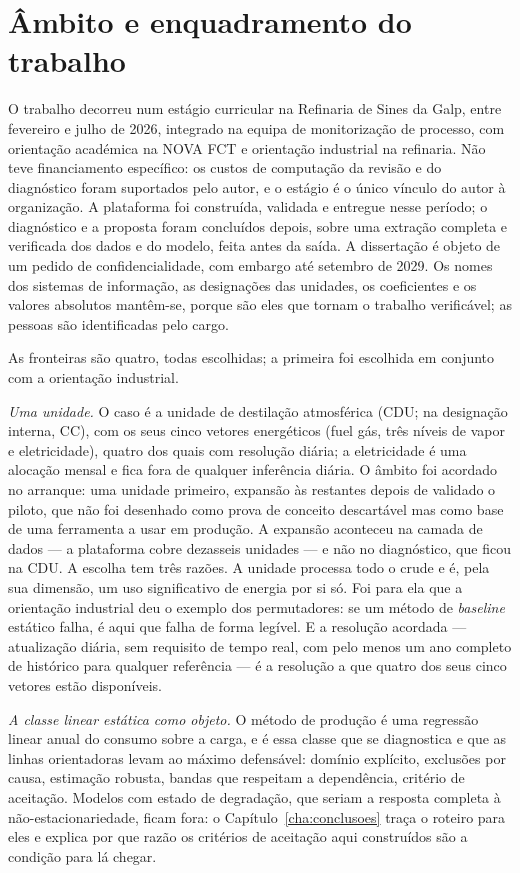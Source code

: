 \section{Âmbito e enquadramento do trabalho}
\label{sec:ambito}

O trabalho decorreu num estágio curricular na Refinaria de Sines da
Galp, entre fevereiro e julho de 2026, integrado na equipa de
monitorização de processo, com orientação académica na NOVA FCT e
orientação industrial na refinaria. Não teve financiamento específico:
os custos de computação da revisão e do diagnóstico foram suportados
pelo autor, e o estágio é o único vínculo do autor à organização. A
plataforma foi construída, validada e entregue nesse período; o
diagnóstico e a proposta foram concluídos depois, sobre uma extração
completa e verificada dos dados e do modelo, feita antes da saída. A
dissertação é objeto de um pedido de confidencialidade, com embargo até
setembro de 2029. Os nomes dos sistemas de informação, as designações
das unidades, os coeficientes e os valores absolutos mantêm-se, porque
são eles que tornam o trabalho verificável; as pessoas são identificadas
pelo cargo.

As fronteiras são quatro, todas escolhidas; a primeira foi escolhida em
conjunto com a orientação industrial.

\emph{Uma unidade.} O caso é a unidade de destilação atmosférica (CDU;
na designação interna, CC), com os seus cinco vetores energéticos (fuel
gás, três níveis de vapor e eletricidade), quatro dos quais com
resolução diária; a eletricidade é uma alocação mensal e fica fora de
qualquer inferência diária. O âmbito foi acordado no arranque: uma
unidade primeiro, expansão às restantes depois de validado o piloto, que
não foi desenhado como prova de conceito descartável mas como base de
uma ferramenta a usar em produção. A expansão aconteceu na camada de
dados --- a plataforma cobre dezasseis unidades --- e não no diagnóstico,
que ficou na CDU. A escolha tem três razões. A unidade processa todo o
crude e é, pela sua dimensão, um uso significativo de energia por si
só. Foi para ela que a orientação industrial deu o exemplo dos
permutadores: se um método de \emph{baseline} estático falha, é aqui que
falha de forma legível. E a resolução acordada --- atualização diária,
sem requisito de tempo real, com pelo menos um ano completo de histórico
para qualquer referência --- é a resolução a que quatro dos seus cinco
vetores estão disponíveis.

\emph{A classe linear estática como objeto.} O método de produção é uma
regressão linear anual do consumo sobre a carga, e é essa classe que se
diagnostica e que as linhas orientadoras levam ao máximo defensável:
domínio explícito, exclusões por causa, estimação robusta, bandas que
respeitam a dependência, critério de aceitação. Modelos com estado de
degradação, que seriam a resposta completa à não-estacionariedade,
ficam fora: o Capítulo~\ref{cha:conclusoes} traça o roteiro para eles e
explica por que razão os critérios de aceitação aqui construídos são a
condição para lá chegar.

